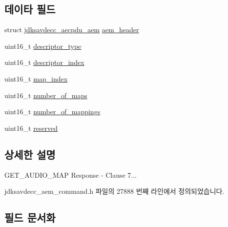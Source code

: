 \subsection*{데이타 필드}
\begin{DoxyCompactItemize}
\item 
struct \hyperlink{structjdksavdecc__aecpdu__aem}{jdksavdecc\+\_\+aecpdu\+\_\+aem} \hyperlink{structjdksavdecc__aem__command__get__audio__map__response_ae1e77ccb75ff5021ad923221eab38294}{aem\+\_\+header}
\item 
uint16\+\_\+t \hyperlink{structjdksavdecc__aem__command__get__audio__map__response_ab7c32b6c7131c13d4ea3b7ee2f09b78d}{descriptor\+\_\+type}
\item 
uint16\+\_\+t \hyperlink{structjdksavdecc__aem__command__get__audio__map__response_a042bbc76d835b82d27c1932431ee38d4}{descriptor\+\_\+index}
\item 
uint16\+\_\+t \hyperlink{structjdksavdecc__aem__command__get__audio__map__response_a3a5e0547986898ad64c07f238d8b7bcf}{map\+\_\+index}
\item 
uint16\+\_\+t \hyperlink{structjdksavdecc__aem__command__get__audio__map__response_a6d00316ed943197ab46c0af22c1d430a}{number\+\_\+of\+\_\+maps}
\item 
uint16\+\_\+t \hyperlink{structjdksavdecc__aem__command__get__audio__map__response_ac7db472c5622ef473d5d0a5c416d5531}{number\+\_\+of\+\_\+mappings}
\item 
uint16\+\_\+t \hyperlink{structjdksavdecc__aem__command__get__audio__map__response_a5a6ed8c04a3db86066924b1a1bf4dad3}{reserved}
\end{DoxyCompactItemize}


\subsection{상세한 설명}
G\+E\+T\+\_\+\+A\+U\+D\+I\+O\+\_\+\+M\+AP Response -\/ Clause 7... 

jdksavdecc\+\_\+aem\+\_\+command.\+h 파일의 27888 번째 라인에서 정의되었습니다.



\subsection{필드 문서화}
